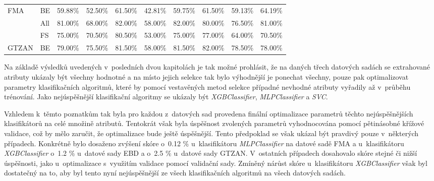 \begin{table}[H]
{\begin{tabular}{llllllllll}
    \multirow{-3}{*}{FMA}   & \multicolumn{1}{l|}{\cellcolor[HTML]{EFEFEF}BE}  & \cellcolor[HTML]{EFEFEF}59.88\% & \cellcolor[HTML]{EFEFEF}52.50\% & \cellcolor[HTML]{EFEFEF}61.50\% & \cellcolor[HTML]{EFEFEF}42.81\% & \cellcolor[HTML]{EFEFEF}59.75\% & \cellcolor[HTML]{EFEFEF}61.50\% & \cellcolor[HTML]{EFEFEF}59.13\% & \cellcolor[HTML]{EFEFEF}64.19\% \\ \cline{1-2}
                            & \multicolumn{1}{l|}{All}                         & 81.00\%                         & 68.00\%                         & 82.00\%                         & 58.00\%                         & 82.00\%                         & 80.00\%                         & 76.50\%                         & 81.00\%                         \\
                            & \multicolumn{1}{l|}{\cellcolor[HTML]{EFEFEF}FS}  & \cellcolor[HTML]{EFEFEF}75.00\% & \cellcolor[HTML]{EFEFEF}70.50\% & \cellcolor[HTML]{EFEFEF}80.50\% & \cellcolor[HTML]{EFEFEF}53.00\% & \cellcolor[HTML]{EFEFEF}75.00\% & \cellcolor[HTML]{EFEFEF}77.00\% & \cellcolor[HTML]{EFEFEF}64.00\% & \cellcolor[HTML]{EFEFEF}70.50\% \\
    \multirow{-3}{*}{GTZAN} & \multicolumn{1}{l|}{BE}                          & 79.00\%                         & 75.50\%                         & 81.50\%                         & 58.00\%                         & 81.50\%                         & 82.00\%                         & 78.50\%                         & 78.00\%                        
    \end{tabular}}
\end{table}

Na základě výsledků uvedených v~posledních dvou kapitolách je tak možné prohlásit, že na daných třech datových sadách se extrahované atributy ukázaly být všechny hodnotné a na místo jejich selekce tak bylo výhodnější je ponechat všechny, pouze pak optimalizovat parametry klasifikačních algoritmů, které by pomocí vestavěných metod selekce případné nevhodné atributy vyřadily až v~průběhu trénování. Jako nejúspěšnější klasifikační algoritmy se ukázaly být \textit{XGBClassifier}, \textit{MLPClassifier} a \textit{SVC}.

Vzhledem k~těmto poznatkům tak byla pro každou z~datových sad provedena finální optimalizace parametrů těchto nejúspěšnějších klasifikátorů na celé množině atributů. Tentokrát však byla úspěšnost zvolených parametrů vyhodnocována pomocí pětinásobné křížové validace, což by mělo zaručit, že optimalizace bude ještě úspěšnější. Tento předpoklad se však ukázal být pravdivý pouze v~některých případech. Konkrétně bylo dosaženo zvýšení skóre o~0.12 \% u~klasifikátoru \textit{MLPClassifier} na datové sadě FMA a u~klasifikátoru \textit{XGBClassifier} o~1.2 \% u~datové sady EBD a o~2.5 \% u~datové sady GTZAN. V~ostatních případech dosahovalo skóre stejné či nižší úspěšnosti, jako u~optimalizace s~využitím validace pomocí validační sady. Zmíněný nárůst skóre u~klasifikátoru \textit{XGBClassifier} však byl dostatečný na to, aby byl tento nyní nejúspěšnější ze všech klasifikačních algoritmů na všech datových sadách.

